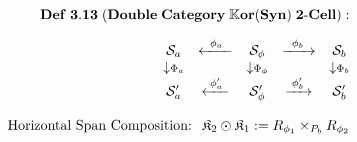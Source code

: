 \documentclass[preview]{standalone}
\begin{document}
\begin{align*}
\special{dvisvgm:raw <g id='unique000'>}\mathbf{Def\;3.13\;(Double\;Category\;\mathbb{K}\mathbf{or}(\mathbf{Syn})\;2\text{-}Cell):}\\[6pt]\begin{matrix} \mathcal{S}_a & \xleftarrow{\;\;\phi_a\;\;} & \mathcal{S}_\phi & \xrightarrow{\;\;\phi_b\;\;} & \mathcal{S}_b \\ \downarrow\scriptstyle\Phi_a & & \downarrow\scriptstyle\Phi_\phi & & \downarrow\scriptstyle\Phi_b \\ \mathcal{S}'_a & \xleftarrow{\;\phi'_a\;} & \mathcal{S}'_\phi & \xrightarrow{\;\phi'_b\;} & \mathcal{S}'_b \end{matrix}\\[8pt]\text{Horizontal Span Composition: }\;\mathfrak{K}_2 \odot \mathfrak{K}_1 := R_{\phi_1}\times_{P_b} R_{\phi_2}\special{dvisvgm:raw </g>}
\end{align*}
\end{document}
